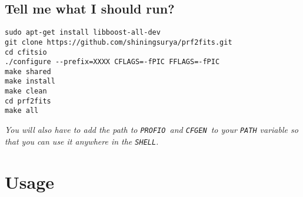 \documentclass{article}
\newcommand{\prf}{\texttt{PROFIO}\ }
\newcommand{\cfgen}{\texttt{CFGEN}\ }
\begin{document}
\subsection*{\hfill Tell me what I should run?}
\begin{lstlisting}
sudo apt-get install libboost-all-dev 
git clone https://github.com/shiningsurya/prf2fits.git 
cd cfitsio
./configure --prefix=XXXX CFLAGS=-fPIC FFLAGS=-fPIC
make shared 
make install
make clean
cd prf2fits 
make all 
\end{lstlisting}
\par \textit{You will also have to add the path to \prf and \cfgen to your \texttt{PATH} variable so that you can use it anywhere in the \texttt{SHELL}.}
\section*{\hfill Usage}
\end{document}
